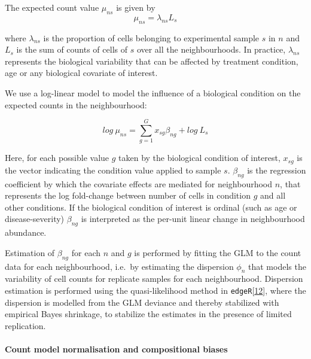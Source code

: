 \documentclass[
]{article}
\begin{document}
The expected count value \(\mu_{ns}\) is given by
\[
\mu_{ns} = \lambda_{ns}L_{s}
\]

where \(\lambda_{ns}\) is the proportion of cells belonging to experimental sample \(s\) in \(n\) and \(L_s\) is the sum of counts of cells of \(s\) over all the neighbourhoods. In practice, \(\lambda_{ns}\) represents the biological variability that can be affected by treatment condition, age or any biological covariate of interest.

We use a log-linear model to model the influence of a biological condition on the expected counts in the neighbourhood:

\begin{equation}
  \label{eq:1}
    log\ \mu_{ns} = \sum_{g=1}^{G}x_{sg}\beta_{ng} + log\ L_s
\end{equation}

Here, for each possible value \(g\) taken by the biological condition of interest, \(x_{sg}\) is the vector indicating the condition value applied to sample \(s\). \(\beta_{ng}\) is the regression coefficient by which the covariate effects are mediated for neighbourhood \(n\), that represents the log fold-change between number of cells in condition \(g\) and all other conditions. If the biological condition of interest is ordinal (such as age or disease-severity) \(\beta_{ng}\) is interpreted as the per-unit linear change in neighbourhood abundance.

Estimation of \(\beta_{ng}\) for each \(n\) and \(g\) is performed by fitting the GLM to the count data for each neighbourhood, i.e.~by estimating the dispersion \(\phi_{n}\) that models the variability of cell counts for replicate samples for each neighbourhood. Dispersion estimation is performed using the quasi-likelihood method in \texttt{edgeR}{[}\protect\hyperlink{ref-robinsonEdgeRBioconductorPackage2010a}{12}{]}, where the dispersion is modelled from the GLM deviance and thereby stabilized with empirical Bayes shrinkage, to stabilize the estimates in the presence of limited replication.

\hypertarget{count-model-normalisation-and-compositional-biases}{%
\paragraph*{Count model normalisation and compositional biases}\label{count-model-normalisation-and-compositional-biases}}
\end{document}
